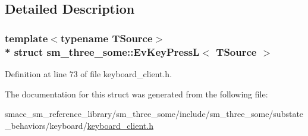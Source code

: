 \subsection{Detailed Description}
\subsubsection*{template$<$typename T\+Source$>$\\*
struct sm\+\_\+three\+\_\+some\+::\+Ev\+Key\+Press\+L$<$ T\+Source $>$}



Definition at line 73 of file keyboard\+\_\+client.\+h.



The documentation for this struct was generated from the following file\+:\begin{DoxyCompactItemize}
\item 
smacc\+\_\+sm\+\_\+reference\+\_\+library/sm\+\_\+three\+\_\+some/include/sm\+\_\+three\+\_\+some/substate\+\_\+behaviors/keyboard/\hyperlink{keyboard__client_8h}{keyboard\+\_\+client.\+h}\end{DoxyCompactItemize}
